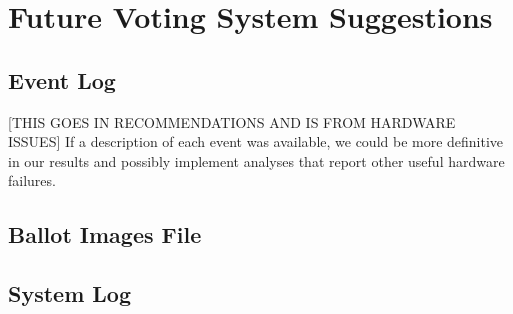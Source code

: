 \section{Future Voting System Suggestions}

\subsection{Event Log}
[THIS GOES IN RECOMMENDATIONS AND IS FROM HARDWARE ISSUES] If a description of each event was available, we could be more definitive in our results and possibly implement analyses that report other useful hardware failures.    

\subsection{Ballot Images File}

\subsection{System Log}
